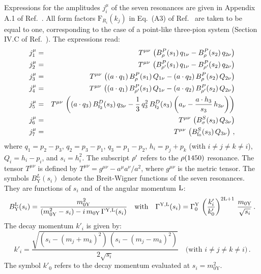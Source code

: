 Expressions for the amplitudes $j_{i}^{\mu}$ of the seven resonances are given in Appendix A.1 of Ref.~\cite{CLEO:1999rzk}.
All form factors $\textrm{F}_{R_{i}}(k_{j})$ in Eq.~(A3) of Ref.~\cite{CLEO:1999rzk} are taken to be equal to one,
corresponding to the case of a point-like three-pion system (\cf Section IV.C of Ref.~\cite{CLEO:1999rzk}).
The expressions read:
\begin{eqnarray}
j_{1}^{\mu} & = & T^{\mu\nu} \, \left( B_{\rho}^{P}(s_{1}) \, q_{1\nu} - B_{\rho}^{P}(s_{2}) \, q_{2\nu} \right) \nonumber \\
j_{2}^{\mu} & = & T^{\mu\nu} \, \left( B_{\rho'}^{P}(s_{1}) \, q_{1\nu} - B_{\rho'}^{P}(s_{2}) \, q_{2\nu} \right) \nonumber \\
j_{3}^{\mu} & = & T^{\mu\nu} \, \left( (a \cdot q_{1}) \, B_{\rho}^{P}(s_{1}) \, Q_{1\nu} - (a \cdot q_{2}) \, B_{\rho}^{P}(s_{2}) \, Q_{2\nu} \right) \nonumber \\
j_{4}^{\mu} & = & T^{\mu\nu} \, \left( (a \cdot q_{1}) \, B_{\rho'}^{P}(s_{1}) \, Q_{1\nu} - (a \cdot q_{2}) \, B_{\rho'}^{P}(s_{2}) \, Q_{2\nu} \right) \nonumber \\
j_{5}^{\mu} & = & T^{\mu\nu} \, \left( (a \cdot q_{3}) \, B_{\textrm{f}_{2}}^{D}(s_{3}) \, q_{3\nu} - \frac{1}{3} \, q_{3}^{2} \, B_{\textrm{f}_{2}}^{D}(s_{3}) \left( a_{\nu} - \frac{a \cdot h_{3}}{s_{3}} \, h_{3\nu} \right) \right) \nonumber \\
j_{6}^{\mu} & = & T^{\mu\nu} \, \left( B_{\sigma}^{S}(s_{3}) \, Q_{3\nu} \right) \nonumber \\
j_{7}^{\mu} & = & T^{\mu\nu} \, \left( B_{\textrm{f}_{0}}^{S}(s_{3}) \, Q_{3\nu} \right) \, ,
\end{eqnarray}
where 
$q_{1} = p_{2} - p_{3}$, $q_{2} = p_{3} - p_{1}$, $q_{3} = p_{1} - p_{2}$,
$h_{i} = p_{j} + p_{k}$ (with $i \not= j \not= k \not= i$),
$Q_{i} = h_{i} - p_{i}$, and $s_{i} = h_{i}^{2}$. 
The subscript $\rho'$ refers to the $\rho\textrm{(1450)}$ resonance.
The tensor $T^{\mu\nu}$ is defined by $T^{\mu\nu} = g^{\mu\nu} - a^{\mu}a^{\nu}/a^{2}$, where $g^{\mu\nu}$ is the metric tensor.
The symbols $B_{\textrm{Y}}^{L}(s_{i})$ denote the Breit-Wigner functions of the seven resonances.
They are functions of $s_{i}$ and of the angular momentum $\textrm{L}$:
\begin{equation}
B_{\textrm{Y}}^{\textrm{L}}(s_{i}) = \frac{m_{0\textrm{Y}}^{2}}{(m_{0\textrm{Y}}^{2} - s_{i}) - i \, m_{0\textrm{Y}} \, \Gamma^{\textrm{Y},\textrm{L}}(s_{i})}
 \quad \mbox{with} \quad
\Gamma^{\textrm{Y},\textrm{L}}(s_{i}) = \Gamma_{0}^{\textrm{Y}} \, \left(\frac{k'_{i}}{k'_{0}}\right)^{2\textrm{L}+1} \, \frac{m_{0\textrm{Y}}}{\sqrt{s_{i}}} \, .
\label{eq:BY}
\end{equation}
The decay momentum $k'_{i}$ is given by:
\begin{equation}
k'_{i} = \frac{\sqrt{\left( s_{i} - (m_{j} + m_{k})^{2} \right) \, \left( s_{i} - (m_{j} - m_{k})^{2} \right)}}{2\sqrt{s_{i}}} 
  \quad \mbox{(with $i \not= j \not= k \not= i$)} \, .
\label{eq:k}
\end{equation}
The symbol $k'_{0}$ refers to the decay momentum evaluated at $s_{i} = m_{0\textrm{Y}}^{2}$.

